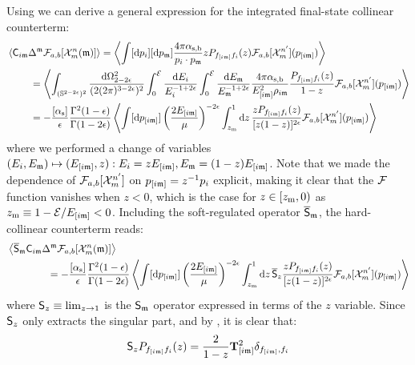 Using  we can derive a general expression for the integrated final-state collinear counterterm:
\begin{equation*}
  \begin{split}
    & \left\langle \mathsf{C}_{i\mathfrak{m}} \Delta^{\mathfrak{m}} \mathcal{F}_{a,b}[\mathcal{X}^{n}_{m}(\mathfrak{m})] \right\rangle = \left\langle \int [\mathrm{d} p_i] [\mathrm{d} p_{\mathfrak{m}}] \frac{4\pi \alpha_\text{s,b}}{p_i \cdot p_{\mathfrak{m}}} z P_{f_{[i\mathfrak{m}]} f_i}(z) \mathcal{F}_{a,b}[\mathcal{X}^{n'}_{m}](p_{[i\mathfrak{m}]}) \right\rangle \\
    & \qquad \ = \left\langle \int_{(\mathbb{S}^{2-2\epsilon})^2} \frac{\mathrm{d} \Omega_{2-2\epsilon}^2}{(2(2\pi)^{3-2\epsilon})^2} \int_0^{\mathcal{E}} \frac{\mathrm{d} E_i}{E_i^{-1+2\epsilon}} \int_0^{\mathcal{E}} \frac{\mathrm{d} E_{\mathfrak{m}}}{E_{\mathfrak{m}}^{-1+2\epsilon}} \frac{4\pi \alpha_\text{s,b}}{E_{[i\mathfrak{m}]}^2 \rho_{i\mathfrak{m}}} \frac{P_{f_{[i\mathfrak{m}]} f_i}(z)}{1-z} \mathcal{F}_{a,b}[\mathcal{X}^{n'}_{m}](p_{[i\mathfrak{m}]}) \right\rangle \\
    & \qquad \ = - \frac{[\alpha_\text{s}]}{\epsilon} \frac{\Gamma^2(1-\epsilon)}{\Gamma(1-2\epsilon)} \left\langle \int [\mathrm{d} p_{[i\mathfrak{m}]}] \left( \frac{2E_{[i\mathfrak{m}]}}{\mu} \right)^{-2\epsilon} \int_{z_\text{m}}^1 \mathrm{d} z\, \frac{z P_{f_{[i\mathfrak{m}]} f_i}(z)}{[z (1-z)]^{2\epsilon}} \mathcal{F}_{a,b}[\mathcal{X}^{n'}_{m}](p_{[i\mathfrak{m}]}) \right\rangle
  \end{split}
\end{equation*}
where we performed a change of variables $ (E_i , E_{\mathfrak{m}}) \mapsto (E_{[i\mathfrak{m}]} , z) : E_i = z E_{[i\mathfrak{m}]} , E_{\mathfrak{m}} = (1-z) E_{[i\mathfrak{m}]} $. Note that we made the dependence of $ \mathcal{F}_{a,b}[\mathcal{X}^{n'}_{m}] $ on $ p_{[i\mathfrak{m}]} = z^{-1} p_i $ explicit, making it clear that the $ \mathcal{F} $ function vanishes when $ z < 0 $, which is the case for $ z \in [z_\text{m},0) $ as $ z_\text{m} \equiv 1 - \mathcal{E} / E_{[i\mathfrak{m}]} < 0 $. Including the soft-regulated operator $ \overline{\mathsf{S}}_{\mathfrak{m}} $, the hard-collinear counterterm reads:
\begin{equation*}
  \begin{split}
    & \left\langle \overline{\mathsf{S}}_{\mathfrak{m}} \mathsf{C}_{i\mathfrak{m}} \Delta^{\mathfrak{m}} \mathcal{F}_{a,b}[\mathcal{X}^{n}_{m}(\mathfrak{m})] \right\rangle \\
    & \qquad \qquad = - \frac{[\alpha_\text{s}]}{\epsilon} \frac{\Gamma^2(1-\epsilon)}{\Gamma(1-2\epsilon)} \left\langle \int [\mathrm{d} p_{[i\mathfrak{m}]}] \left( \frac{2E_{[i\mathfrak{m}]}}{\mu} \right)^{-2\epsilon} \int_{z_\text{m}}^1 \mathrm{d} z\, \overline{\mathsf{S}}_z \frac{z P_{f_{[i\mathfrak{m}]} f_i}(z)}{[z (1-z)]^{2\epsilon}} \mathcal{F}_{a,b}[\mathcal{X}^{n'}_{m}](p_{[i\mathfrak{m}]}) \right\rangle
  \end{split}
\end{equation*}
where $ \mathsf{S}_z \equiv \lim_{z \rightarrow 1} $ is the $ \mathsf{S}_{\mathfrak{m}} $ operator expressed in terms of the $ z $ variable. Since $ \mathsf{S}_z $ only extracts the singular part, and by , it is clear that:
\begin{equation}
  \mathsf{S}_z P_{f_{[i\mathfrak{m}]}f_i}(z) = \frac{2}{1 - z} \mathbf{T}^2_{[i\mathfrak{m}]} \delta_{f_{[i\mathfrak{m}]},f_i}
\end{equation}
